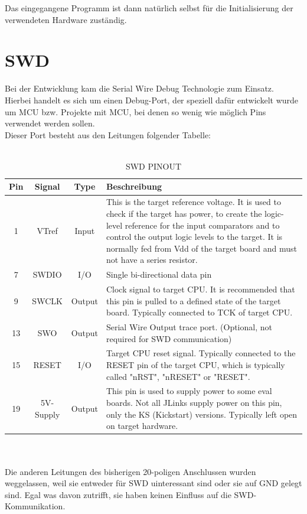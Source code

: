 Das eingegangene Programm ist dann nat\"urlich selbst f\"ur die Initialisierung
der verwendeten Hardware zust\"andig.\\

\section{SWD}
Bei der Entwicklung kam die Serial Wire Debug Technologie zum Einsatz. Hierbei 
handelt es sich um einen Debug-Port, der speziell daf\"ur entwickelt wurde
 um MCU bzw. Projekte mit MCU, bei denen so wenig wie m\"oglich Pins verwendet
 werden sollen. \\
Dieser Port besteht aus den Leitungen folgender Tabelle:\\\\
\begin{table}
\caption{SWD PINOUT}
\begin{tabular}{|c|c|c|p{10cm}|}
\hline \hline
	Pin & Signal & Type & Beschreibung \\ \hline
1 & VTref & Input & This is the target reference voltage. It is used to
 check if the target has power, to create the logic-level reference for
 the input comparators and to control the output logic levels to the target.
 It is normally fed from Vdd of the target board and must not have a series resistor.\\ \hline
7 & SWDIO & I/O & Single bi-directional data pin\\ \hline
9 & SWCLK & Output & Clock signal to target CPU. It is recommended that
 this pin is pulled to a defined state of the target board. Typically
 connected to TCK of target CPU.\\ \hline
13 & SWO & Output & Serial Wire Output trace port. (Optional, not required
for SWD communication)\\ \hline
15 & RESET & I/O & Target CPU reset signal. Typically connected to the
 RESET pin of the target CPU, which is typically called "nRST", "nRESET"
 or "RESET".\\ \hline
19 & 5V-Supply & Output & This pin is used to supply power to some eval boards.
Not all JLinks supply power on this pin, only the KS (Kickstart) versions.
Typically left open on target hardware.\\ \hline
\end{tabular}
\end{table}\\\\

Die anderen Leitungen des bisherigen 20-poligen Anschlussen wurden weggelassen,
weil sie entweder f\"ur SWD uinteressant sind oder sie auf GND gelegt sind. Egal
was davon zutrifft, sie haben keinen Einfluss auf die SWD-Kommunikation.

